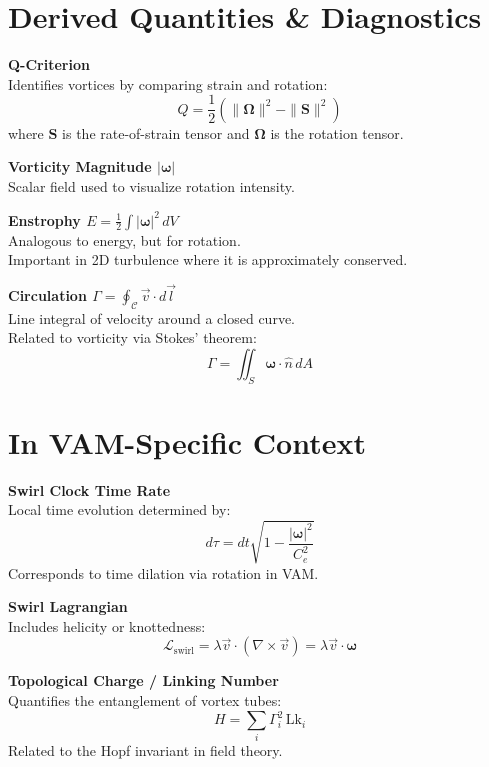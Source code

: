 \documentclass[a4paper, aps,preprint,superscriptaddress, 12pt]{revtex4}
\begin{document}
    \section*{Derived Quantities \& Diagnostics}

    \textbf{Q-Criterion} \\
    Identifies vortices by comparing strain and rotation:
    \[
        Q = \frac{1}{2} \left( \| \boldsymbol{\Omega} \|^2 - \| \mathbf{S} \|^2 \right)
    \]
    where \( \mathbf{S} \) is the rate-of-strain tensor and \( \boldsymbol{\Omega} \) is the rotation tensor.

    \medskip
    \textbf{Vorticity Magnitude \( |\boldsymbol{\omega}| \)} \\
    Scalar field used to visualize rotation intensity.

    \medskip
    \textbf{Enstrophy \( E = \frac{1}{2} \int |\boldsymbol{\omega}|^2 \, dV \)} \\
    Analogous to energy, but for rotation. \\
    Important in 2D turbulence where it is approximately conserved.

    \medskip
    \textbf{Circulation \( \Gamma = \oint_{\mathcal{C}} \vec{v} \cdot d\vec{l} \)} \\
    Line integral of velocity around a closed curve. \\
    Related to vorticity via Stokes' theorem:
    \[
        \Gamma = \iint_S \boldsymbol{\omega} \cdot \hat{n} \, dA
    \]

    \section*{In VAM-Specific Context}

    \textbf{Swirl Clock Time Rate} \\
    Local time evolution determined by:
    \[
        d\tau = dt \sqrt{1 - \frac{|\boldsymbol{\omega}|^2}{C_e^2}}
    \]
    Corresponds to time dilation via rotation in VAM.

    \medskip
    \textbf{Swirl Lagrangian} \\
    Includes helicity or knottedness:
    \[
        \mathcal{L}_{\text{swirl}} = \lambda \vec{v} \cdot (\nabla \times \vec{v}) = \lambda \vec{v} \cdot \boldsymbol{\omega}
    \]

    \medskip
    \textbf{Topological Charge / Linking Number} \\
    Quantifies the entanglement of vortex tubes:
    \[
        H = \sum_i \Gamma_i^2 \, \text{Lk}_i
    \]
    Related to the Hopf invariant in field theory.
\end{document}
